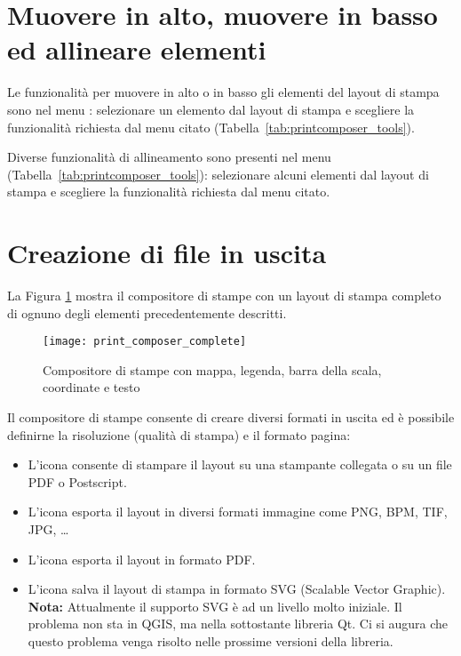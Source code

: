 \section{Muovere in alto, muovere in basso ed allineare elementi}

Le funzionalità per muovere in alto o in basso gli elementi del layout di 
stampa sono nel menu : 
selezionare un elemento dal layout di stampa e scegliere la funzionalità richiesta 
dal menu citato (Tabella~\ref{tab:printcomposer_tools}).

Diverse funzionalità di allineamento sono presenti nel menu 
 (Tabella~\ref{tab:printcomposer_tools}): selezionare alcuni elementi dal layout di 
stampa e scegliere la funzionalità richiesta dal menu citato.

\section{Creazione di file in uscita}

La Figura \ref{fig:print_composer_complete} mostra il compositore di stampe
con un layout di stampa completo di ognuno degli elementi precedentemente
descritti.

\begin{figure}[h]
   \centering
   \texttt{[image: print\_composer\_complete]}
   \caption{Compositore di stampe con mappa, legenda, barra della scala, coordinate e testo \nixcaption} \label{fig:print_composer_complete}
\end{figure}

Il compositore di stampe consente di creare diversi formati in uscita ed è
possibile definirne la risoluzione (qualità di stampa) e il formato pagina:

\begin{itemize}[label=--]
\item L'icona  consente di stampare il
layout su una stampante collegata o su un file PDF o Postscript.
\item L'icona 
esporta il layout in diversi formati immagine come PNG, BPM, TIF, JPG, \dots
\item L'icona  esporta il layout in 
formato PDF.
\item L'icona  salva il layout
di stampa in formato SVG (Scalable Vector Graphic). \textbf{Nota:} Attualmente
il supporto SVG è ad un livello molto iniziale. Il problema non sta in QGIS,
ma nella sottostante libreria Qt. Ci si augura che questo problema venga
risolto nelle prossime versioni della libreria.
\end{itemize}

